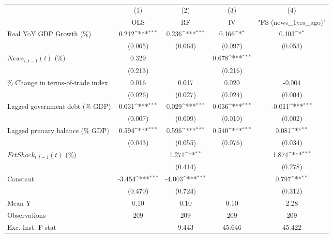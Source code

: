 {
\def\sym#1{\ifmmode^{#1}\else\(^{#1}\)\fi}
\begin{tabular}{l*{4}{c}}
\toprule
                    &\multicolumn{1}{c}{(1)}&\multicolumn{1}{c}{(2)}&\multicolumn{1}{c}{(3)}&\multicolumn{1}{c}{(4)}\\
                    &\multicolumn{1}{c}{OLS}&\multicolumn{1}{c}{RF}&\multicolumn{1}{c}{IV}&\multicolumn{1}{c}{ "FS (news_1yrs_ago)" }\\
\midrule
Real YoY GDP Growth (\%)&       0.212\sym{***}&       0.236\sym{***}&       0.166\sym{*}  &       0.103\sym{*}  \\
                    &     (0.065)         &     (0.064)         &     (0.097)         &     (0.053)         \\
\addlinespace
$ News_{i,t-1}(t)$ (\%)&       0.329         &                     &       0.678\sym{***}&                     \\
                    &     (0.213)         &                     &     (0.216)         &                     \\
\addlinespace
\% Change in terms-of-trade index&       0.016         &       0.017         &       0.020         &      -0.004         \\
                    &     (0.026)         &     (0.027)         &     (0.024)         &     (0.004)         \\
\addlinespace
Lagged government debt (\% GDP)&       0.031\sym{***}&       0.029\sym{***}&       0.036\sym{***}&      -0.011\sym{***}\\
                    &     (0.007)         &     (0.009)         &     (0.010)         &     (0.002)         \\
\addlinespace
Lagged primary balance (\% GDP)&       0.594\sym{***}&       0.596\sym{***}&       0.540\sym{***}&       0.081\sym{**} \\
                    &     (0.043)         &     (0.055)         &     (0.076)         &     (0.034)         \\
\addlinespace
$ FctShock_{i,t-1}(t)$ (\%)&                     &       1.271\sym{**} &                     &       1.874\sym{***}\\
                    &                     &     (0.414)         &                     &     (0.278)         \\
\addlinespace
Constant            &      -3.454\sym{***}&      -4.003\sym{***}&                     &       0.797\sym{**} \\
                    &     (0.470)         &     (0.724)         &                     &     (0.312)         \\
\midrule
Mean Y              &        0.10         &        0.10         &        0.10         &        2.28         \\
Observations        &         209         &         209         &         209         &         209         \\
Exc. Inst. F-stat   &                     &       9.443         &      45.646         &      45.422         \\
\bottomrule
\end{tabular}
}
